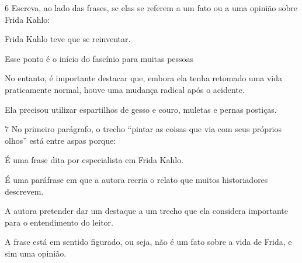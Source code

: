 \num{6} Escreva, ao lado das frases, se elas se referem a um fato ou a
uma opinião sobre Frida Kahlo:

\begin{escolha}
\item Frida Kahlo teve que se reinventar. 
\item Esse ponto é o início do fascínio para muitas
pessoas 
\item No entanto, é importante destacar que, embora ela tenha retomado
uma vida praticamente normal, houve uma mudança radical após o
acidente. 
\item Ela precisou utilizar espartilhos de gesso e couro, muletas e
pernas postiças. 
\end{escolha}

\num{7} No primeiro parágrafo, o trecho ``pintar as coisas que via com
seus próprios olhos'' está entre aspas porque:

\begin{escolha}
\item É uma frase dita por especialista em Frida Kahlo.
\item É uma paráfrase em que a autora recria o relato que muitos
historiadores descrevem.  
\item A autora pretender dar um destaque a um trecho que ela considera
importante para o entendimento do leitor.
\item A frase está em sentido figurado, ou seja, não é um fato sobre a vida
de Frida, e sim uma opinião.
\end{escolha}



